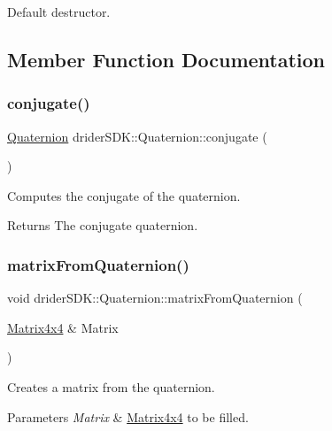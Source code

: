 Default destructor. 

\subsection{Member Function Documentation}
\mbox{\label{classdrider_s_d_k_1_1_quaternion_aa2f2f19f27b36910669f84acb1e88f8f}} 
\subsubsection{\texorpdfstring{conjugate()}{conjugate()}}
{\footnotesize\ttfamily \hyperlink{classdrider_s_d_k_1_1_quaternion}{Quaternion} drider\+S\+D\+K\+::\+Quaternion\+::conjugate (\begin{DoxyParamCaption}{ }\end{DoxyParamCaption})}

Computes the conjugate of the quaternion.

\begin{DoxyReturn}{Returns}
The conjugate quaternion. 
\end{DoxyReturn}
\mbox{\label{classdrider_s_d_k_1_1_quaternion_a2fd752f214ccf84e6bdad3c7a21f0e7f}} 
\subsubsection{\texorpdfstring{matrix\+From\+Quaternion()}{matrixFromQuaternion()}}
{\footnotesize\ttfamily void drider\+S\+D\+K\+::\+Quaternion\+::matrix\+From\+Quaternion (\begin{DoxyParamCaption}\item[{\hyperlink{classdrider_s_d_k_1_1_matrix4x4}{Matrix4x4} \&}]{Matrix }\end{DoxyParamCaption})}

Creates a matrix from the quaternion.


\begin{DoxyParams}{Parameters}
{\em Matrix} & \hyperlink{classdrider_s_d_k_1_1_matrix4x4}{Matrix4x4} to be filled. \\
\hline
\end{DoxyParams}
\mbox{\label{classdrider_s_d_k_1_1_quaternion_af549c85e1b2e1a67668a193cf66da927}} 
